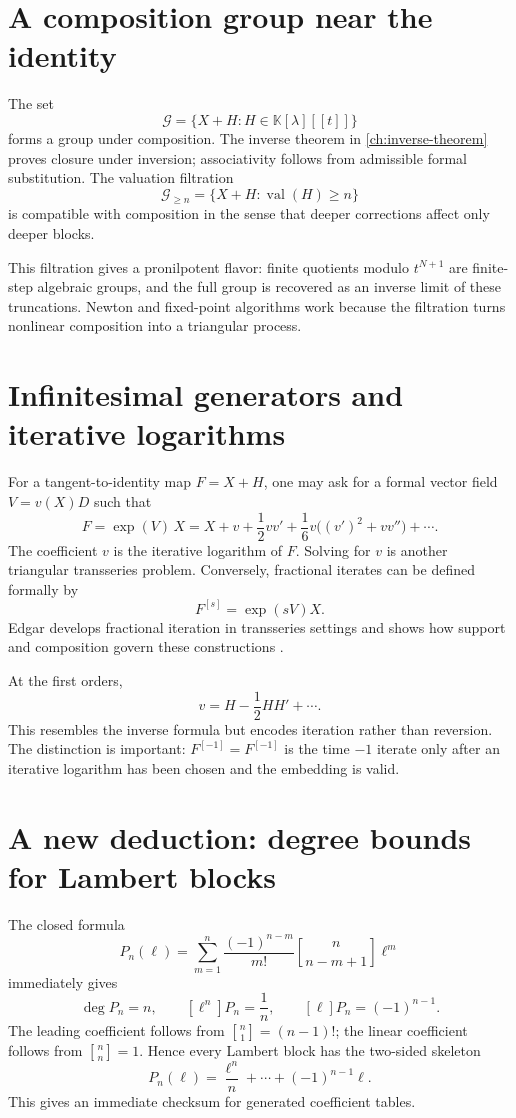 \documentclass[11pt,openany]{book}
\theoremstyle{definition}
\theoremstyle{plain}
\theoremstyle{remark}
\newcommand{\K}{\mathbb{K}}
\newcommand{\invcomp}{^{[-1]}}
\newcommand{\stirlingone}[2]{\genfrac{[}{]}{0pt}{}{#1}{#2}}
\DeclareMathOperator{\val}{val}
\begin{document}
\section{A composition group near the identity}
The set
\[
 \mathcal G=\{X+H:H\in\K[\lambda][[t]]\}
\]
forms a group under composition. The inverse theorem in \cref{ch:inverse-theorem} proves closure under inversion; associativity follows from admissible formal substitution. The valuation filtration
\[
 \mathcal G_{\ge n}=\{X+H:\val(H)\ge n\}
\]
is compatible with composition in the sense that deeper corrections affect only deeper blocks.

This filtration gives a pronilpotent flavor: finite quotients modulo \(t^{N+1}\) are finite-step algebraic groups, and the full group is recovered as an inverse limit of these truncations. Newton and fixed-point algorithms work because the filtration turns nonlinear composition into a triangular process.


\section{Infinitesimal generators and iterative logarithms}
For a tangent-to-identity map \(F=X+H\), one may ask for a formal vector field \(V=v(X)D\) such that
\[
 F=\exp(V)\,X
 =X+v+\frac12v v'+\frac16v\bigl((v')^2+vv''\bigr)+\cdots.
\]
The coefficient \(v\) is the iterative logarithm of \(F\). Solving for \(v\) is another triangular transseries problem. Conversely, fractional iterates can be defined formally by
\[
 F^{[s]}=\exp(sV)X.
\]
Edgar develops fractional iteration in transseries settings and shows how support and composition govern these constructions \cite{edgar-fractional}.

At the first orders,
\[
 v=H-\frac12HH'+\cdots.
\]
This resembles the inverse formula but encodes iteration rather than reversion. The distinction is important: \(F\invcomp=F^{[-1]}\) is the time \(-1\) iterate only after an iterative logarithm has been chosen and the embedding is valid.

\section{A new deduction: degree bounds for Lambert blocks}
The closed formula
\[
 P_n(\ell)=\sum_{m=1}^{n}
 \frac{(-1)^{n-m}}{m!}\stirlingone{n}{n-m+1}\ell^m
\]
immediately gives
\[
 \deg P_n=n,
 \qquad
 [\ell^n]P_n=\frac1n,
 \qquad
 [\ell]P_n=(-1)^{n-1}.
\]
The leading coefficient follows from \(\stirlingone{n}{1}=(n-1)!\); the linear coefficient follows from \(\stirlingone{n}{n}=1\). Hence every Lambert block has the two-sided skeleton
\begin{equation}\label{eq:Pn-skeleton}
 P_n(\ell)=\frac{\ell^n}{n}+\cdots+(-1)^{n-1}\ell.
\end{equation}
This gives an immediate checksum for generated coefficient tables.
\end{document}
